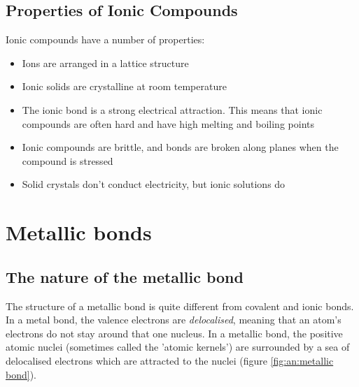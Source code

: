 \subsection{Properties of Ionic Compounds}
\label{subsec:bonding:ionic properties}

Ionic compounds have a number of properties:

\begin{itemize}
\item{Ions are arranged in a lattice structure}
\item{Ionic solids are crystalline at room temperature}
\item{The ionic bond is a strong electrical attraction. This means that ionic compounds are often hard and have high melting and boiling points}
\item{Ionic compounds are brittle, and bonds are broken along planes when the compound is stressed}
\item{Solid crystals don't conduct electricity, but ionic solutions do}
\end{itemize}







\section{Metallic bonds}

\subsection{The nature of the metallic bond}

The structure of a metallic bond is quite different from covalent and ionic bonds. In a metal bond, the valence electrons are \textit{delocalised}, meaning that an atom's electrons do not stay around that one nucleus. In a metallic bond, the positive atomic nuclei (sometimes called the 'atomic kernels') are surrounded by a sea of delocalised electrons which are attracted to the nuclei (figure \ref{fig:an:metallic bond}).



